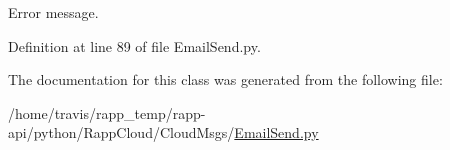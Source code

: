 Error message. 



Definition at line 89 of file Email\-Send.\-py.



The documentation for this class was generated from the following file\-:\begin{DoxyCompactItemize}
\item 
/home/travis/rapp\-\_\-temp/rapp-\/api/python/\-Rapp\-Cloud/\-Cloud\-Msgs/\hyperlink{EmailSend_8py}{Email\-Send.\-py}\end{DoxyCompactItemize}
